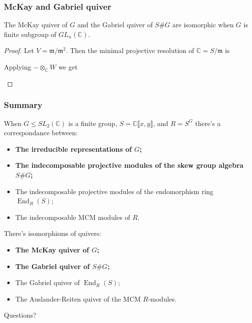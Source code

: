 \documentclass[screen, aspectratio=43]{beamer}
\theoremstyle{definition}
\newcommand{\C}{\mathbb{C}}
\DeclareMathOperator{\End}{End}
\begin{document}
\begin{frame}[fragile]
	\frametitle{McKay and Gabriel quiver}
	\begin{theorem}
		The McKay quiver of $G$ and the Gabriel quiver of $S\#G$ are isomorphic when $G$ is finite subgroup of $GL_n(\C)$.
		\begin{proof}
		Let $V = \mathfrak{m}/\mathfrak{m}^2$. Then the minimal projective resolution of $\C = S / \mathfrak{m}$ is
		\begin{center}
		\end{center}
		Applying $- \otimes_\C W$ we get
		\begin{center}
		\end{center}
		\end{proof}
	\end{theorem}
\end{frame}

\begin{frame}
	\frametitle{Summary}
	When $G \leq SL_2(\C)$ is a finite group, $S = \C\llbracket x, y \rrbracket$, and $R=S^G$ there's a correspondance between:
	\begin{itemize}
		\item \textbf{The irreducible representations of $G$;}
		\item \textbf{The indecomposable projective modules of the skew group algebra $S\#G$;}
		\item The indecomposable projective modules of the endomorphism ring $\End_R(S)$;
		\item The indecomposable MCM modules of $R$.
	\end{itemize}
	There's isomorphisms of quivers:
	\begin{itemize}
		\item \textbf{The McKay quiver of $G$;}
		\item \textbf{The Gabriel quiver of $S\#G$;}
		\item The Gabriel quiver of $\End_R(S)$;
		\item The Auslander-Reiten quiver of the MCM $R$-modules.
	\end{itemize}
\end{frame}

\begin{frame}
	\begin{center}  
	\vspace{2cm}
    \begingroup
      \fontsize{40pt}{12pt}\selectfont
      Questions? 
    \endgroup
  	\end{center}	
\end{frame}

\end{document}
